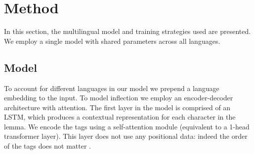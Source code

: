 \documentclass[11pt,a4paper]{article}
\begin{document}





\section{Method}

In this section, the multilingual model and training strategies used
are presented. We employ a single model with shared parameters
across all languages. 

\subsection{Model}

To account for different languages in our model we prepend a language
embedding to the input.
To model inflection we employ an encoder-decoder architecture with
attention. The first layer in the model is comprised of an LSTM, which
produces a contextual representation for each character in the lemma.
We encode the tags using a self-attention module (equivalent to a
1-head transformer layer).  This layer does not use any positional
data: indeed the order of the tags does not matter
\cite{DBLP:conf/emnlp/AnastasopoulosN19}.
\end{document}
